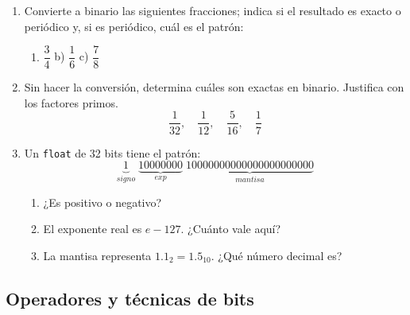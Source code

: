 \documentclass[12pt, oneside]{article}
\begin{document}
\begin{enumerate}[resume]
  \item Convierte a binario las siguientes fracciones; indica si el resultado
        es exacto o periódico y, si es periódico, cuál es el patrón:
        \begin{enumerate}
          \item $\dfrac{3}{4}$ \qquad b) $\dfrac{1}{6}$ \qquad c) $\dfrac{7}{8}$
        \end{enumerate}
  \item Sin hacer la conversión, determina cuáles son exactas en binario.
        Justifica con los factores primos.
        \[
          \frac{1}{32}, \quad \frac{1}{12}, \quad \frac{5}{16}, \quad \frac{1}{7}
        \]
  \item Un \texttt{float} de 32 bits tiene el patrón:
        \[
          \underbrace{1}_{signo}\;
          \underbrace{10000000}_{exp}\;
          \underbrace{10000000000000000000000}_{mantisa}
        \]
        \begin{enumerate}
          \item ¿Es positivo o negativo?
          \item El exponente real es $e - 127$. ¿Cuánto vale aquí?
          \item La mantisa representa $1.1_2 = 1.5_{10}$. ¿Qué número decimal es?
        \end{enumerate}
\end{enumerate}

\subsection{Operadores y técnicas de bits}
\end{document}
